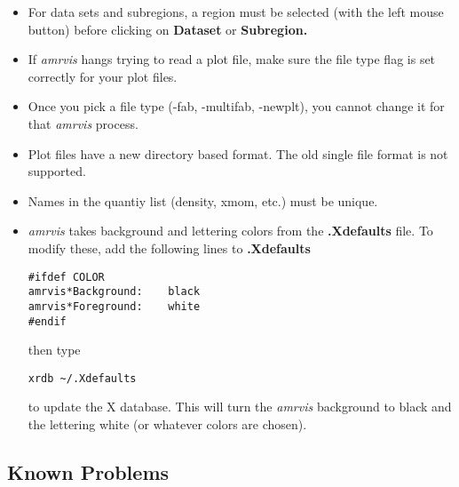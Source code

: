 \begin{itemize}

\item For data sets and subregions, a region must be selected (with
the left mouse button) before clicking on {\bf Dataset} or {\bf Subregion.}
    
\item If {\em amrvis} hangs trying to read a plot file, make sure the file type
flag is set correctly for your plot files.

\item Once you pick a file type (-fab, -multifab, -newplt), you cannot
change it for that {\em amrvis} process.

\item Plot files have a new directory based format.  The old single file
format is not supported.

\item Names in the quantiy list (density, xmom, etc.) must be unique.

\item {\em amrvis} takes background and lettering colors from
the {\bf .Xdefaults} file.
To modify these, add the following lines to {\bf .Xdefaults}

\begin{verbatim}
#ifdef COLOR
amrvis*Background:    black
amrvis*Foreground:    white
#endif
\end{verbatim}

then type

\begin{verbatim}
xrdb ~/.Xdefaults
\end{verbatim}

to update the X database.  This will turn the {\em amrvis} background to black
and the lettering white (or whatever colors are chosen).

\end{itemize}


\subsection{Known Problems}

